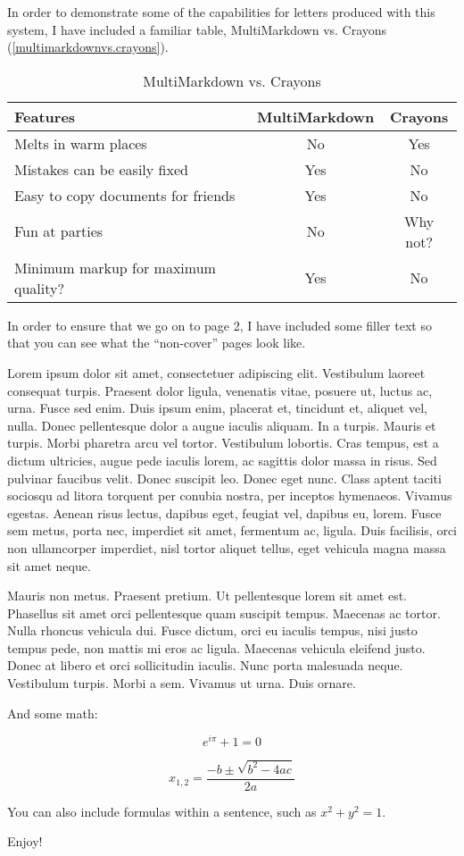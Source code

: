 In order to demonstrate some of the capabilities for letters produced with
this system, I have included a familiar table, MultiMarkdown vs. Crayons (\autoref{multimarkdownvs.crayons}).

\begin{table}[htbp]
\begin{minipage}{\linewidth}
\setlength{\tymax}{0.5\linewidth}
\centering
\small
\caption{MultiMarkdown vs. Crayons}
\label{multimarkdownvs.crayons}
\begin{tabular}{@{}lcc@{}} \toprule
Features&MultiMarkdown&Crayons\\
\midrule
Melts in warm places&No&Yes\\
Mistakes can be easily fixed&Yes&No\\
Easy to copy documents for friends&Yes&No\\
Fun at parties&No&Why not?\\

\midrule
Minimum markup for maximum quality?&Yes&No\\

\bottomrule

\end{tabular}
\end{minipage}
\end{table}


In order to ensure that we go on to page 2, I have included some filler text
so that you can see what the ``non-cover'' pages look like.

Lorem ipsum dolor sit amet, consectetuer adipiscing elit. Vestibulum laoreet
consequat turpis. Praesent dolor ligula, venenatis vitae, posuere ut, luctus
ac, urna. Fusce sed enim. Duis ipsum enim, placerat et, tincidunt et, aliquet
vel, nulla. Donec pellentesque dolor a augue iaculis aliquam. In a turpis.
Mauris et turpis. Morbi pharetra arcu vel tortor. Vestibulum lobortis. Cras
tempus, est a dictum ultricies, augue pede iaculis lorem, ac sagittis dolor
massa in risus. Sed pulvinar faucibus velit. Donec suscipit leo. Donec eget
nunc. Class aptent taciti sociosqu ad litora torquent per conubia nostra, per
inceptos hymenaeos. Vivamus egestas. Aenean risus lectus, dapibus eget,
feugiat vel, dapibus eu, lorem. Fusce sem metus, porta nec, imperdiet sit
amet, fermentum ac, ligula. Duis facilisis, orci non ullamcorper imperdiet,
nisl tortor aliquet tellus, eget vehicula magna massa sit amet neque.

Mauris non metus. Praesent pretium. Ut pellentesque lorem sit amet est.
Phasellus sit amet orci pellentesque quam suscipit tempus. Maecenas ac tortor.
Nulla rhoncus vehicula dui. Fusce dictum, orci eu iaculis tempus, nisi justo
tempus pede, non mattis mi eros ac ligula. Maecenas vehicula eleifend justo.
Donec at libero et orci sollicitudin iaculis. Nunc porta malesuada neque.
Vestibulum turpis. Morbi a sem. Vivamus ut urna. Duis ornare.

And some math:

\[ {e}^{i\pi }+1=0 \]

\[ {x}_{1,2}=\frac{-b\pm \sqrt{{b}^{2}-4ac}}{2a} \]

You can also include formulas within a sentence, such as
\({x}^{2}+{y}^{2}=1\).

Enjoy!




